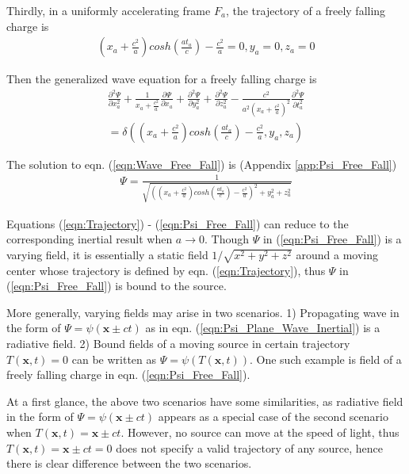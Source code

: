 \documentclass[prd,showpacs,preprint]{revtex4}
\begin{document}
Thirdly, in a uniformly accelerating frame $F_a$, the trajectory of a freely falling charge is
\begin{eqnarray}
(x_a+\frac{c^2}{a})cosh(\frac{at_a}{c})-\frac{c^2}{a}=0,
y_a=0,
z_a=0
\label{eqn:Trajectory}
\end{eqnarray}

Then the generalized wave equation for a freely falling charge is
\begin{eqnarray}
\frac{\partial^2 \Psi}{\partial x_a^2} + \frac{1}{x_a+\frac{c^2}{a}}\frac{\partial \Psi}{\partial x_a} + \frac{\partial^2 \Psi}{\partial y_a^2} + \frac{\partial^2 \Psi}{\partial z_a^2} - \frac{c^2}{a^2(x_a+\frac{c^2}{a})^2}\frac{\partial^2 \Psi}{\partial t_a^2}\nonumber\\
=\delta((x_a+\frac{c^2}{a})cosh(\frac{at_a}{c})-\frac{c^2}{a},y_a,z_a)
\label{eqn:Wave_Free_Fall}
\end{eqnarray}

The solution to eqn. (\ref{eqn:Wave_Free_Fall}) is (Appendix \ref{app:Psi_Free_Fall})
\begin{eqnarray}
\Psi=\frac{1}{\sqrt{((x_a+\frac{c^2}{a})cosh(\frac{at_a}{c})-\frac{c^2}{a})^2+y_a^2+z_a^2}}
\label{eqn:Psi_Free_Fall}
\end{eqnarray}

Equations (\ref{eqn:Trajectory}) - (\ref{eqn:Psi_Free_Fall}) can reduce to the corresponding inertial result when $a\to 0$. Though $\Psi$ in (\ref{eqn:Psi_Free_Fall}) is a varying field, it is essentially a static field $1/\sqrt{x^2+y^2+z^2}$ around a moving center whose trajectory is defined by eqn. (\ref{eqn:Trajectory}), thus $\Psi$ in (\ref{eqn:Psi_Free_Fall}) is bound to the source.

More generally, varying fields may arise in two scenarios. 1) Propagating wave in the form of $\Psi=\psi(\mathbf{x}\pm ct)$ as in eqn. (\ref{eqn:Psi_Plane_Wave_Inertial}) is a radiative field. 2) Bound fields of a moving source in certain trajectory $T(\mathbf{x},t)=0$ can be written as $\Psi=\psi(T(\mathbf{x},t))$. One such example is field of a freely falling charge in eqn. (\ref{eqn:Psi_Free_Fall}).

At a first glance, the above two scenarios have some similarities, as radiative field in the form of $\Psi=\psi(\mathbf{x}\pm ct)$ appears as a special case of the second scenario when $T(\mathbf{x},t)=\mathbf{x}\pm ct$. However, no source can move at the speed of light, thus $T(\mathbf{x},t)=\mathbf{x}\pm ct=0$ does not specify a valid trajectory of any source, hence there is clear difference between the two scenarios.
\end{document}
